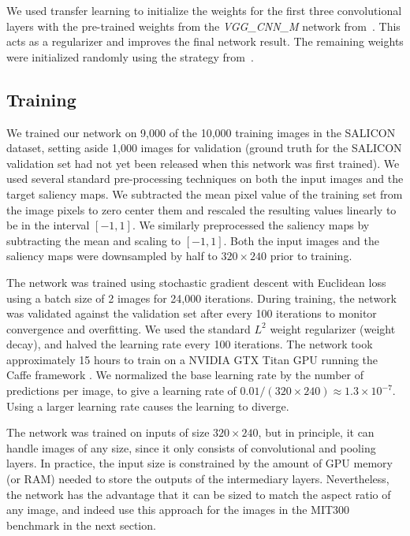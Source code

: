 \documentclass[10pt,twocolumn,letterpaper]{article}
\begin{document}
We used transfer learning to initialize the weights for the first three convolutional layers with the pre-trained weights from the \emph{VGG\_CNN\_M} network from~\cite{chatfield2014devil}. This acts as a regularizer and improves the final network result. The remaining weights were initialized randomly using the strategy from~\cite{he2015rectifiers}. 

\subsection{Training}

We trained our network on 9,000 of the 10,000 training images in the SALICON dataset, setting aside 1,000 images for validation (ground truth for the SALICON validation set had not yet been released when this network was first trained). We used several standard pre-processing techniques on both the input images and the target saliency maps. We subtracted the mean pixel value of the training set from the image pixels to zero center them and rescaled the resulting values linearly to be in the interval $[-1,1]$. We similarly preprocessed the saliency maps by subtracting the mean and scaling to $[-1,1]$. Both the input images and the saliency maps were downsampled by half to $320 \times 240$ prior to training.

The network was trained using stochastic gradient descent with Euclidean loss using a batch size of 2 images for 24,000 iterations. During training, the network was validated against the validation set after every 100 iterations to monitor convergence and overfitting. We used the standard $L^2$ weight regularizer (weight decay), and halved the learning rate every 100 iterations. The network took approximately 15 hours to train on a NVIDIA GTX Titan GPU running the Caffe framework \cite{jia2014caffe}. We normalized the base learning rate by the number of predictions per image, to give a learning rate of $0.01 / (320 \times 240) \approx 1.3 \times 10^{-7}$. Using a larger learning rate causes the learning to diverge.

The network was trained on inputs of size $320 \times 240$, but in principle, it can handle images of any size, since it only consists of convolutional and pooling layers. In practice, the input size is constrained by the amount of GPU memory (or RAM) needed to store the outputs of the intermediary layers. Nevertheless, the network has the advantage that it can be sized to match the aspect ratio of any image, and indeed use this approach for the images in the MIT300 benchmark in the next section.
\end{document}
